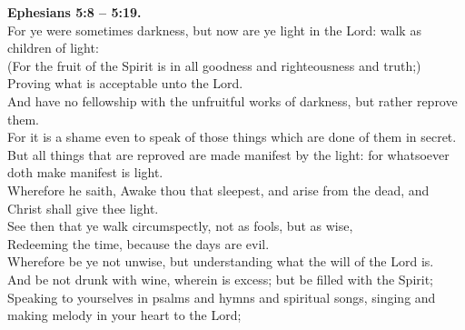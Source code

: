 \documentclass[10pt]{article} %
\begin{document}
{\begin{minipage}[t]{0.45\textwidth}
\textbf{Ephesians 5:8 -- 5:19.}\\
For ye were sometimes darkness, but now are ye light in the Lord: walk as children of light:\\
(For the fruit of the Spirit is in all goodness and righteousness and truth;)\\
Proving what is acceptable unto the Lord.\\
And have no fellowship with the unfruitful works of darkness, but rather reprove them.\\
For it is a shame even to speak of those things which are done of them in secret.\\
But all things that are reproved are made manifest by the light: for whatsoever doth make manifest is light.\\
Wherefore he saith, Awake thou that sleepest, and arise from the dead, and Christ shall give thee light.\\
See then that ye walk circumspectly, not as fools, but as wise,\\
Redeeming the time, because the days are evil.\\
Wherefore be ye not unwise, but understanding what the will of the Lord is.\\
And be not drunk with wine, wherein is excess; but be filled with the Spirit;\\
Speaking to yourselves in psalms and hymns and spiritual songs, singing and making melody in your heart to the Lord;\\
\end{minipage}}
\vspace*{\fill}
\newpage\Huge
\vspace*{\fill}
\singlespacing %
\vspace*{\fill}
\end{document}
